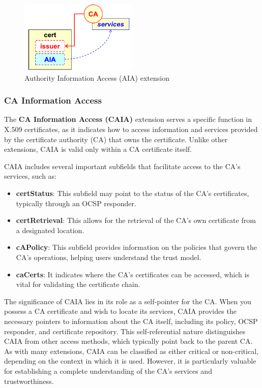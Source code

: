 \begin{figure}[h]
  \centering
  \includegraphics[width=0.5\textwidth]{img/x509 AIA.png}

  \caption{Authority Information Access (AIA) extension}
\end{figure}

\subsubsection{CA Information Access}

The \textbf{CA Information Access (CAIA)} extension serves a 
specific function in X.509 certificates, as it indicates how to 
access information and services provided by the certificate 
authority (CA) that owns the certificate. Unlike other 
extensions, CAIA is valid only within a CA certificate itself.

CAIA includes several important subfields that facilitate access 
to the CA's services, such as:
\begin{itemize}
  \item \textbf{certStatus}: This subfield may point to the status of 
    the CA's certificates, typically through an OCSP responder.
  \item \textbf{certRetrieval}: This allows for the retrieval of the 
    CA's own certificate from a designated location.
  \item \textbf{cAPolicy}: This subfield provides information on the 
    policies that govern the CA's operations, helping users 
    understand the trust model.
  \item \textbf{caCerts}: It indicates where the CA's certificates can 
    be accessed, which is vital for validating the certificate 
    chain.
\end{itemize}

The significance of CAIA lies in its role as a self-pointer for 
the CA. When you possess a CA certificate and wish to locate its 
services, CAIA provides the necessary pointers to information 
about the CA itself, including its policy, OCSP responder, and 
certificate repository. This self-referential nature distinguishes 
CAIA from other access methods, which typically point back to the 
parent CA. As with many extensions, CAIA can be classified as 
either critical or non-critical, depending on the context in 
which it is used. However, it is particularly valuable for 
establishing a complete understanding of the CA's services and 
trustworthiness.

